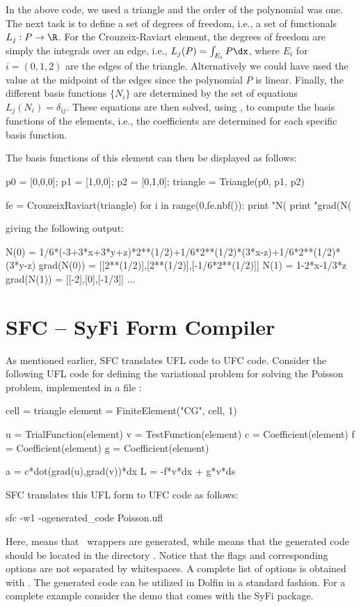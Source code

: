 In the above code, we used a triangle and the order of the polynomial was one. The next task is to 
define a set of degrees of freedom, i.e., a set of functionals $L_j : P \rightarrow \R$. 
For the Crouzeix-Raviart element, the degrees of freedom are simply the integrals 
over an edge, i.e., $L_j(P) = \int_{E_i} P \dx$, where $E_i$ for $i=(0,1,2)$ are the edges of 
the triangle. Alternatively we could have used
the value at the midpoint of the edges since the polynomial $P$ is linear. 
Finally, the different basis functions $\{N_i\}$ are determined by the  
set of equations $L_j(N_i) = \delta_{ij}$. 
These equations are then solved, using , to compute the basis functions of the elements, i.e., the
coefficients \emp{[a0\_0, a0\_1, a0\_2]}  are determined for each specific basis function.

The basis functions of this element can then be displayed as follows: 
\begin{python}
p0 = [0,0,0]; p1 = [1,0,0]; p2 = [0,1,0]; 
triangle = Triangle(p0, p1, p2) 

fe = CrouzeixRaviart(triangle)
for i in range(0,fe.nbf()): 
  print "N(%
  print "grad(N(%
\end{python}
giving the following output: 
\begin{c++}
N(0)       =  1/6*(-3+3*x+3*y+z)*2**(1/2)+1/6*2**(1/2)*(3*x-z)+1/6*2**(1/2)*(3*y-z)
grad(N(0)) =  [[2**(1/2)],[2**(1/2)],[-1/6*2**(1/2)]]
N(1)       =  1-2*x-1/3*z
grad(N(1)) =  [[-2],[0],[-1/3]]
...
\end{c++}



\section{SFC -- SyFi Form Compiler}

As mentioned earlier, SFC translates UFL code to UFC code. Consider the 
following UFL code for defining the  variational problem for solving
the Poisson problem, implemented in a file :
\begin{python}
cell = triangle
element = FiniteElement("CG", cell, 1)

u = TrialFunction(element)
v = TestFunction(element)
c = Coefficient(element)
f = Coefficient(element)
g = Coefficient(element)

a = c*dot(grad(u),grad(v))*dx
L = -f*v*dx + g*v*ds
\end{python}
SFC translates this UFL form to UFC code as follows: 
\begin{bash}
sfc -w1  -ogenerated_code Poisson.ufl
\end{bash}
Here,  means that \dolfin\ wrappers are generated, while
 means that the generated code should be located
in the directory . Notice that the flags and
corresponding options are not separated by whitespaces. A complete
list of options is obtained with .  
The generated code can be utilized in Dolfin in a standard fashion. 
For a complete example consider the demo  that
comes with the SyFi package. 

